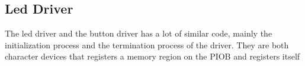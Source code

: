 \subsection{Led Driver}
The led driver and the button driver has a lot of similar code, mainly the 
initialization process and the termination process of the driver. 
They are both character devices that registers a memory region on the 
PIOB and registers itself 